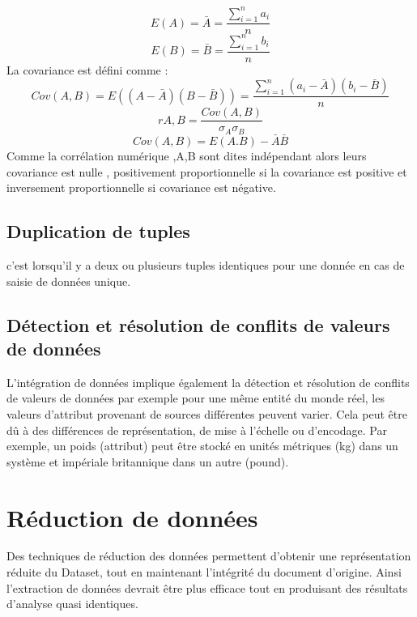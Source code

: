 \documentclass[12pt,a4paper,oneside]{book}
\begin{document}
\begin{equation*}
	E(A)=\bar{A}=\frac{\sum_{i=1}^{n} a_{i}}{n}
\end{equation*}
\begin{equation*}
	E(B)=\bar{B}=\frac{\sum_{i=1}^{n} b_{i}}{n}
\end{equation*}
La covariance est défini comme :
\begin{equation*}
	Cov(A,B)=E((A-\bar{A})(B-\bar{B})) = \frac{\sum_{i=1}^{n} (a_{i}-\bar{A})(b_{i}-\bar{B})}{n }
\end{equation*}
\begin{equation*}
	r A,B= \frac{Cov(A,B)}{\sigma_{A}\sigma_{B}}
\end{equation*}
\begin{equation*}
	Cov(A,B)= E(A.B)-\bar{A}\bar{B}
\end{equation*}
Comme la corrélation numérique ,A,B sont dites indépendant alors leurs covariance est nulle , positivement proportionnelle si la covariance est positive et inversement proportionnelle si covariance est négative.
\subsection{Duplication de tuples}
c'est lorsqu'il y a deux ou plusieurs tuples identiques pour une donnée en cas de saisie de données unique.
\subsection{Détection et résolution de conflits de valeurs de données}

L’intégration de données implique également la
détection et résolution de conflits de valeurs de données
par exemple pour une même entité du monde réel, les valeurs d'attribut provenant de sources différentes peuvent varier.
Cela peut être dû à des différences de représentation, de mise à l'échelle ou d'encodage. Par exemple, un  poids (attribut) peut être stocké en unités métriques (kg) dans un système et impériale britannique  dans un autre (pound).

\section{Réduction de données}
Des techniques de réduction des données permettent d'obtenir une représentation réduite du Dataset, tout en maintenant l'intégrité du document d'origine.
Ainsi l'extraction de données devrait être plus efficace tout en produisant des résultats d'analyse quasi identiques.
\end{document}
